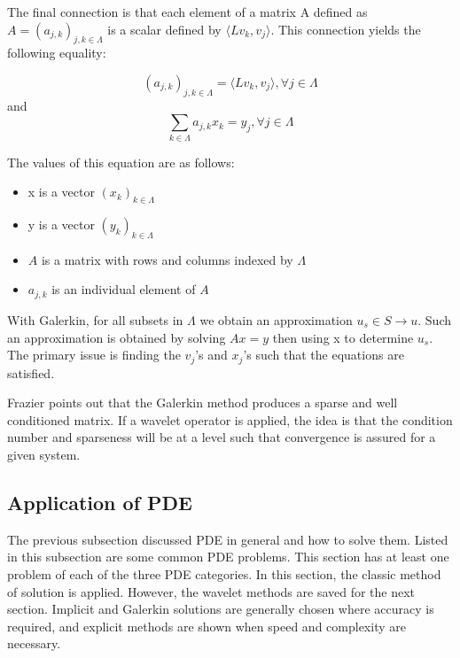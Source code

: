 
The final connection is that each element of a matrix A defined as $A=(a_{j,k} )_{j,k \in \Lambda}$ is a scalar defined by  $\langle Lv_k , v_j \rangle$.  This connection yields the following equality:

\[(a_{j,k} )_{j,k \in \Lambda} = \langle Lv_k , v_j \rangle ,  \forall j\in \Lambda\] and \[\sum_{k\in \Lambda} a_{j,k} x_k = y_j,  \forall j\in \Lambda\]

The values of this equation are as follows:
\begin{itemize}
\item x is a vector $(x_k)_{k\in \Lambda}$
\item y is a vector $(y_k)_{k\in \Lambda}$ 
\item $A$ is a matrix with rows and columns indexed by $\Lambda$
\item $a_{j,k}$ is an individual element of $A$

\end{itemize}

With Galerkin, for all subsets in $\Lambda$ we obtain an approximation $u_s \in S \to u$.  Such an approximation is obtained by %
 solving $Ax=y$ then using x to determine $u_s$.  The primary issue %
 is finding  the $v_j$'s and $x_j$'s such that the equations are satisfied.  

Frazier points %
 out that the Galerkin method produces a sparse and well conditioned %
 matrix. %
   If a wavelet operator is applied, the idea is that the condition number and sparseness will be at a level such that convergence is assured for a given system.  %
   
  

\subsection {Application of PDE}
The previous subsection discussed PDE in general and how to solve them.  Listed in this subsection are some common PDE problems.  This section has at least one problem of each of the three PDE categories.  In this section, the classic method of solution is applied.  However, the wavelet methods are saved for the next section.  Implicit and Galerkin solutions are generally chosen where accuracy is required, and explicit methods are shown when speed and complexity are necessary.  

